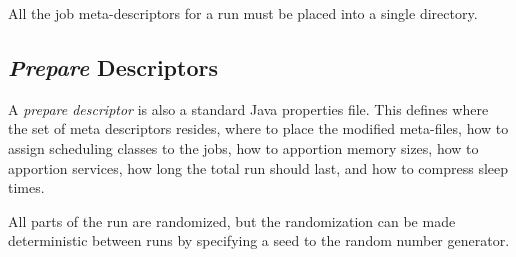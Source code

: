        All the job meta-descriptors for a run must be placed into a single directory.


     \subsection{{\em Prepare} Descriptors}
     \label{subsec:simulation.run-description}
     A  {\em prepare descriptor} is also a
     standard Java properties file.  This defines where the set of meta descriptors resides,
     where to place the modified meta-files, how to assign scheduling classes to the
     jobs, how to apportion memory sizes, how to apportion services, how long the total
     run should last, and how to compress sleep times.  

     All parts of the run are randomized, but the randomization can be made deterministic
     between runs by specifying a seed to the random number generator.

